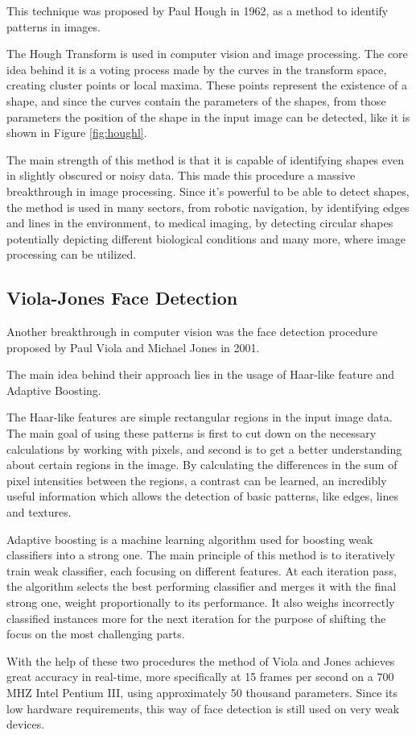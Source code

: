 \par This technique was proposed by Paul Hough in 1962, as a method to identify patterns in images. \cite{Duda1972}
\par The Hough Transform is used in computer vision and image processing. The core idea behind it is a voting process made by the curves in the transform space, creating cluster points or local maxima. These points represent the existence of a shape, and since the curves contain the parameters of the shapes, from those parameters the position of the shape in the input image can be detected, like it is shown in Figure \ref{fig:houghl}.
\par The main strength of this method is that it is capable of identifying shapes even in slightly obscured or noisy data. This made this procedure a massive breakthrough in image processing. Since it's powerful to be able to detect shapes, the method is used in many sectors, from robotic navigation, by identifying edges and lines in the environment, to medical imaging, by detecting circular shapes potentially depicting different biological conditions and many more, where image processing can be utilized.

\subsection{Viola-Jones Face Detection}
\label{subsec:relatedsec1subsec2}
\par Another breakthrough in computer vision was the face detection procedure proposed by Paul Viola and Michael Jones in 2001. \cite{viola2001}
\par The main idea behind their approach lies in the usage of Haar-like feature and Adaptive Boosting.
\par The Haar-like features are simple rectangular regions in the input image data. The main goal of using these patterns is first to cut down on the necessary calculations by working with pixels, and second is to get a better understanding about certain regions in the image. By calculating the differences in the sum of pixel intensities between the regions, a contrast can be learned, an incredibly useful information which allows the detection of basic patterns, like edges, lines and textures.
\par Adaptive boosting is a machine learning algorithm used for boosting weak classifiers into a strong one. The main principle of this method is to iteratively  train weak classifier, each focusing on different features. At each iteration pass, the algorithm selects the best performing classifier and merges it with the final strong one, weight proportionally to its performance. It also weighs incorrectly classified instances more for the next iteration for the purpose of shifting the focus on the most challenging parts.
\par With the help of these two procedures the method of Viola and Jones achieves great accuracy in real-time, more specifically at 15 frames per second on a 700 MHZ Intel Pentium III, using approximately 50 thousand parameters. Since its low hardware requirements, this way of face detection is still used on very weak devices.

